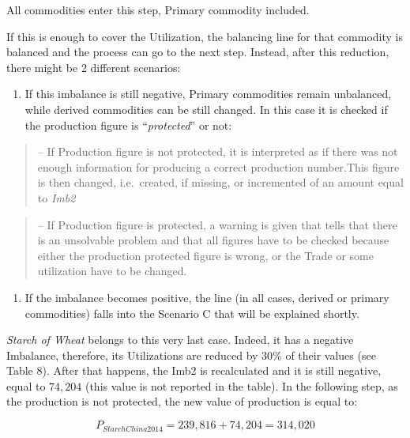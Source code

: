 \documentclass[]{article}
\providecommand{\tightlist}{%
  \setlength{\itemsep}{0pt}\setlength{\parskip}{0pt}}
\begin{document}
All commodities enter this step, Primary commodity included.

If this is enough to cover the Utilization, the balancing line for that
commodity is balanced and the process can go to the next step. Instead,
after this reduction, there might be 2 different scenarios:

\begin{enumerate}
\def\labelenumi{\arabic{enumi}.}
\tightlist
\item
  If this imbalance is still negative, Primary commodities remain
  unbalanced, while derived commodities can be still changed. In this
  case it is checked if the production figure is ``\emph{protected}'' or
  not:
\end{enumerate}

\begin{quote}
-- If Production figure is not protected, it is interpreted as if there
was not enough information for producing a correct production
number.This figure is then changed, i.e.~created, if missing, or
incremented of an amount equal to \emph{Imb2}
\end{quote}

\begin{quote}
-- If Production figure is protected, a warning is given that tells that
there is an unsolvable problem and that all figures have to be checked
because either the production protected figure is wrong, or the Trade or
some utilization have to be changed.
\end{quote}

\begin{enumerate}
\def\labelenumi{\arabic{enumi}.}
\setcounter{enumi}{1}
\tightlist
\item
  If the imbalance becomes positive, the line (in all cases, derived or
  primary commodities) falls into the Scenario C that will be explained
  shortly.
\end{enumerate}

\emph{Starch of Wheat} belongs to this very last case. Indeed, it has a
negative Imbalance, therefore, its Utilizations are reduced by 30\% of
their values (see Table 8). After that happens, the Imb2 is recalculated
and it is still negative, equal to \(74,204\) (this value is not
reported in the table). In the following step, as the production is not
protected, the new value of production is equal to:

\begin{equation}
\label{eq:prod}
P_{StarchChina2014} = 239,816 + 74,204 = 314,020
\end{equation}
\end{document}
